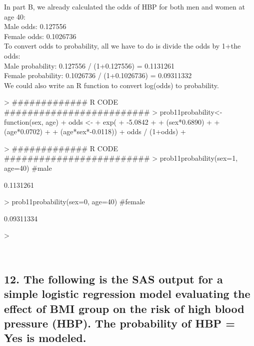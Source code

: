 \documentclass{article}
\begin{document}
\noindent In part B, we already calculated the odds of HBP for both men and women at age 40:\\
Male odds: 0.127556\\
Female odds: 0.1026736 \\

\noindent To convert odds to probability, all we have to do is divide the odds by 1+the odds: \\
Male probability: 0.127556 / (1+0.127556) = 0.1131261 \\
Female probability: 0.1026736 / (1+0.1026736) = 0.09311332  \\

We could also write an R function to convert log(odds) to probability.\\
\begin{Schunk}
\begin{Sinput}
> ############# R CODE #########################
> prob11probability<- function(sex, age){
+     odds <-
+       exp(
+       -5.0842 + 
+     (sex*0.6890) +
+     (age*0.0702) +
+     (age*sex*-0.0118))
+     odds / (1+odds)    
+ }
\end{Sinput}
\end{Schunk}


\begin{Schunk}
\begin{Sinput}
> ############# R CODE #########################
> prob11probability(sex=1, age=40) #male
\end{Sinput}
\begin{Soutput}
[1] 0.1131261
\end{Soutput}
\begin{Sinput}
> prob11probability(sex=0, age=40) #female
\end{Sinput}
\begin{Soutput}
[1] 0.09311334
\end{Soutput}
\begin{Sinput}
> 
\end{Sinput}
\end{Schunk}


 \\


\newpage
\subsection*{12. The following is the SAS output for a simple logistic regression model evaluating the effect of BMI group on the risk of high blood pressure (HBP).  The probability of HBP = Yes is modeled.}
\end{document}
